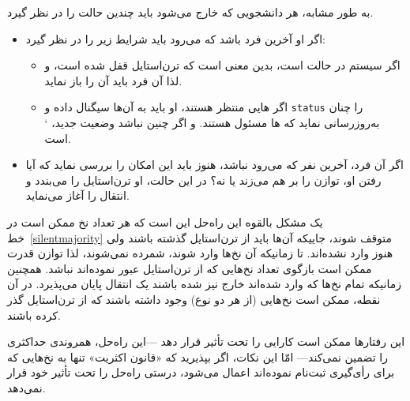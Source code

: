 \documentclass{book}
\newcommand{\clearemptydoublepage}{\newpage\cleardoublepage}
\begin{document}
    به طور مشابه، هر دانشجویی که خارج می‌شود باید چندین حالت را در نظر گیرد. 

\begin{itemize}

\item
    اگر او آخرین فرد  باشد که می‌رود باید شرایط زیر را در نظر گیرد: 

    \begin{itemize}

    \item
        اگر سیستم در حالت  است، بدین معنی است که ترن‌استایل   قفل شده است، و لذا آن فرد باید آن را باز نماید. 

    \item 
    اگر هایی منتظر هستند، او باید به آن‌ها سیگنال داده و {\tt status}  را چنان به‌روزرسانی نماید که ها 
    مسئول هستند. و اگر چنین نباشد وضعیت جدید،       ` است. 

    \end{itemize}  

\item
    اگر آن فرد، آخرین نفر   که می‌رود نباشد، هنوز باید این امکان را بررسی نماید که آیا رفتن او، توازن را بر هم می‌زند یا نه؟ 
    در این حالت، او ترن‌استایل  را می‌بندد و انتقال را آغاز می‌نماید. 

\end{itemize}

    

    یک مشکل بالقوه این راه‌حل این است که هر تعداد نخ‌ ممکن است در خط~\ref{silentmajority} متوقف شوند، جاییکه آن‌ها 
    باید از ترن‌استایل گذشته باشند ولی هنوز وارد نشده‌اند. تا زمانیکه آن‌ نخ‌ها وارد شوند، شمرده نمی‌شوند، لذا توازن قدرت ممکن است 
    بازگوی تعداد نخ‌هایی که از ترن‌استایل عبور نموده‌اند نباشد. همچنین زمانیکه تمام نخ‌ها که وارد شده‌اند خارج نیز شده باشند یک انتقال 
    پایان می‌پذیرد. در آن نقطه، ممکن است نخ‌هایی (از هر دو نوع) وجود داشته باشند که از ترن‌استایل گذر کرده باشند. 
    
    این رفتارها ممکن است کارایی را تحت تأثیر قرار دهد ---این راه‌حل، همروندی حداکثری را تضمین نمی‌کند--- امّا این نکات،
    اگر بپذیرید که «قانون اکثریت»  تنها به نخ‌هایی که برای رأی‌گیری ثبت‌نام نموده‌اند اعمال می‌شود، 
    درستی راه‌حل را تحت تأثیر خود قرار نمی‌دهد. 
    

\clearemptydoublepage
\end{document}
